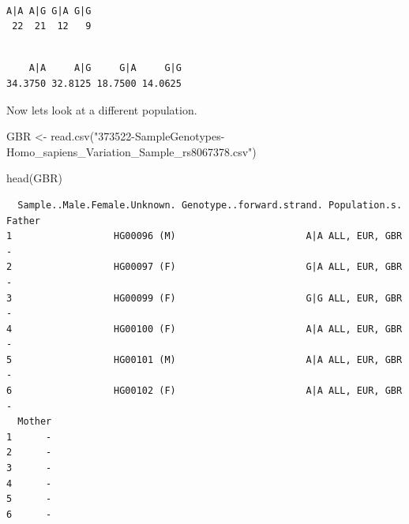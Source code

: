 \documentclass[
  letterpaper,
  DIV=11,
  numbers=noendperiod]{scrartcl}
\newenvironment{Shaded}{\begin{snugshade}}{\end{snugshade}}
\newcommand{\DecValTok}[1]{\textcolor[rgb]{0.68,0.00,0.00}{#1}}
\newcommand{\FunctionTok}[1]{\textcolor[rgb]{0.28,0.35,0.67}{#1}}
\newcommand{\NormalTok}[1]{\textcolor[rgb]{0.00,0.23,0.31}{#1}}
\newcommand{\OtherTok}[1]{\textcolor[rgb]{0.00,0.23,0.31}{#1}}
\newcommand{\SpecialCharTok}[1]{\textcolor[rgb]{0.37,0.37,0.37}{#1}}
\newcommand{\StringTok}[1]{\textcolor[rgb]{0.13,0.47,0.30}{#1}}
\begin{document}
\begin{Shaded}
\end{Shaded}

\begin{verbatim}

A|A A|G G|A G|G 
 22  21  12   9 
\end{verbatim}

\begin{Shaded}
\end{Shaded}

\begin{verbatim}

    A|A     A|G     G|A     G|G 
34.3750 32.8125 18.7500 14.0625 
\end{verbatim}

Now lets look at a different population.

\begin{Shaded}
\begin{Highlighting}[]
\NormalTok{GBR }\OtherTok{\textless{}{-}} \FunctionTok{read.csv}\NormalTok{(}\StringTok{"373522{-}SampleGenotypes{-}Homo\_sapiens\_Variation\_Sample\_rs8067378.csv"}\NormalTok{)}
\end{Highlighting}
\end{Shaded}

\begin{Shaded}
\begin{Highlighting}[]
\FunctionTok{head}\NormalTok{(GBR)}
\end{Highlighting}
\end{Shaded}

\begin{verbatim}
  Sample..Male.Female.Unknown. Genotype..forward.strand. Population.s. Father
1                  HG00096 (M)                       A|A ALL, EUR, GBR      -
2                  HG00097 (F)                       G|A ALL, EUR, GBR      -
3                  HG00099 (F)                       G|G ALL, EUR, GBR      -
4                  HG00100 (F)                       A|A ALL, EUR, GBR      -
5                  HG00101 (M)                       A|A ALL, EUR, GBR      -
6                  HG00102 (F)                       A|A ALL, EUR, GBR      -
  Mother
1      -
2      -
3      -
4      -
5      -
6      -
\end{verbatim}
\end{document}
